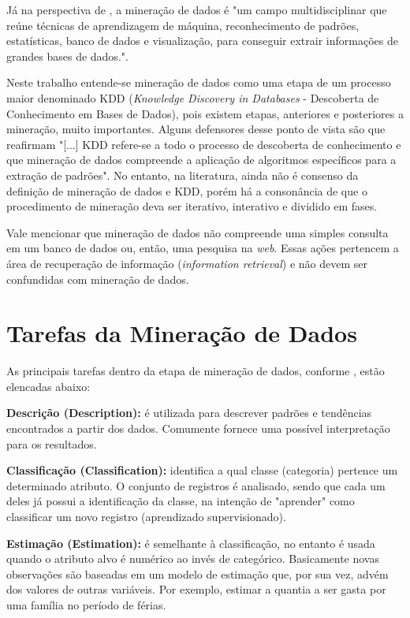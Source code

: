 \documentclass[projtg]{mdtufsm}
\begin{document}
Já na perspectiva de \cite{cabena}, a mineração de dados é "um campo multidisciplinar que reúne técnicas de aprendizagem de máquina, reconhecimento de padrões, estatísticas, banco de dados e visualização, para conseguir extrair informações de grandes bases de dados.". 

Neste trabalho entende-se mineração de dados como uma etapa de um processo maior denominado KDD ({\it Knowledge Discovery in Databases} - Descoberta de Conhecimento em Bases de Dados), pois existem etapas, anteriores e posteriores a mineração, muito importantes. Alguns defensores desse ponto de vista são \cite{fayyad} que reafirmam "[...] KDD refere-se a todo o processo de descoberta de conhecimento e que mineração de dados compreende a aplicação de algoritmos específicos para a extração de padrões". No entanto, na literatura, ainda não é consenso da definição de mineração de dados e KDD, porém há a consonância de que o procedimento de mineração deva ser iterativo, interativo e dividido em fases.  

Vale mencionar que mineração de dados não compreende uma simples consulta em um banco de dados ou, então, uma pesquisa na \textit{web}. Essas ações pertencem a área de recuperação de informação (\textit{information retrieval}) e não devem ser confundidas com mineração de dados.

\section{Tarefas da Mineração de Dados}

As principais tarefas dentro da etapa de mineração de dados, conforme \cite{larose2005}, estão elencadas abaixo:

\textbf{Descrição (Description):} é utilizada para descrever padrões e tendências encontrados a partir dos dados. Comumente fornece uma possível interpretação para os resultados. 

\textbf{Classificação (Classification):} identifica a qual classe (categoria) pertence um determinado atributo. O conjunto de registros é analisado, sendo que cada um deles já possui a identificação da classe, na intenção de "aprender" como classificar um novo registro (aprendizado supervisionado).

\textbf{Estimação (Estimation):} é semelhante à classificação, no entanto é usada quando o atributo alvo é numérico ao invés de categórico. Basicamente novas observações são baseadas em um modelo de estimação que, por sua vez, advém dos valores de outras variáveis. Por exemplo, estimar a quantia a ser gasta por uma família no período de férias. 
\end{document}
